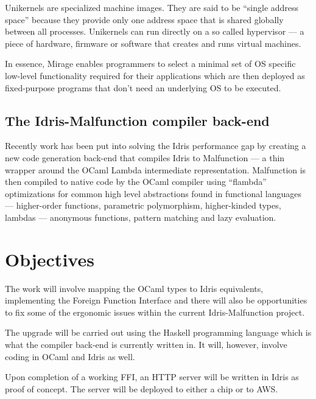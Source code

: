 \documentclass[a4paper, 12pt, oneside]{report}
\begin{document}
Unikernels are specialized machine images.
They are said to be ``single address space'' because they provide only one
address space that is shared globally between all processes.
Unikernels can run directly on a so called hypervisor --- a piece of hardware,
firmware or software that creates and runs virtual machines.

In essence, Mirage enables programmers to select a minimal set of OS specific
low-level functionality required for their applications which are then deployed
as fixed-purpose programs that don't need an underlying OS to be executed.

\subsection{The Idris-Malfunction compiler back-end}
Recently work has been put into solving the Idris performance gap by creating a
new code generation back-end that compiles Idris to Malfunction --- a thin
wrapper around the OCaml Lambda intermediate representation.
Malfunction is then compiled to native code by the OCaml compiler using
``flambda'' optimizations for common high level abstractions found in functional languages --- higher-order functions, parametric polymorphism,
higher-kinded types, lambdas --- anonymous functions, pattern matching and
lazy evaluation.




\section{Objectives}

The work will involve mapping the OCaml types to Idris equivalents,
implementing the Foreign Function Interface and there will also be
opportunities to fix some of the ergonomic issues within the current
Idris-Malfunction project.

The upgrade will be carried out using the Haskell programming language which is
what the compiler back-end is currently written in.
It will, however, involve coding in OCaml and Idris as well.

Upon completion of a working FFI, an HTTP server will be written in Idris as
proof of concept.
The server will be deployed to either a chip or to AWS.
\end{document}
